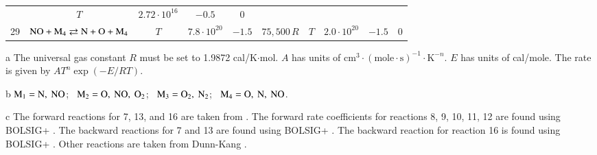 \documentclass{warpdoc}
\begin{document}
\begin{table}[t]
\begin{center}
\begin{threeparttable}
\begin{tabular}{cccccccccc}
                                          &$T$ & $2.72 \cdot 10^{16}$  & $-0.5$  & 0\\
29 & $\rm NO + M_4 \rightleftarrows N + O + M_4$ &$T$ & $7.8 \cdot 10^{20}$ & $-1.5$ & $75,500\, R$ 
                                          &$T$ & $2.0 \cdot 10^{20}$  & $-1.5$  & 0\\
\bottomrule
\end{tabular}
\begin{tablenotes}
\item[{a}] The universal gas constant $R$ must be set to 1.9872	cal/K$\cdot$mol. $A$ has units of $\textrm{cm}^3\cdot(\textrm{mole}\cdot \textrm{s})^{-1}\cdot \textrm{K}^{-n}$. $E$ has units of cal/mole. The rate is given by $A T^n \exp(-E/RT).$
\item[{b}] $\rm M_1=N,~NO$;~ $\rm M_2=O,~NO,~O_2$;~ $\rm M_3=O_2,~N_2$;~ $\rm M_4=O,~N,~NO$.
\item[{c}] The forward reactions for 7, 13, and 16 are taken from \cite{pf:2007:boyd}. The forward rate coefficients for reactions 8, 9, 10, 11, 12 are found using BOLSIG+ \cite{psst:2005:hagelaar,pcpp:1992:morgan}. The backward reactions for 7 and 13 are found using BOLSIG+ \cite{psst:2005:hagelaar,jgr:1974:walls}. The backward reaction for reaction 16 is found using BOLSIG+ \cite{psst:2005:hagelaar,jap:2021:abdoulanziz}. Other reactions are taken from Dunn-Kang \cite{nasa:1973:dunn}.
\end{tablenotes}
\label{tab:parentdunn}
\end{threeparttable}
\end{center}
\end{table}
%
\end{document}
